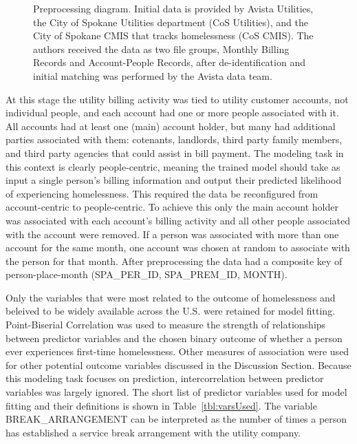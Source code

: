 \documentclass[10pt,letterpaper]{article}
\begin{document}
\begin{figure}[!h]
    \caption{Preprocessing diagram. Initial data is provided by Avista Utilities, the City of Spokane Utilities department (CoS Utilities), and the City of Spokane CMIS that tracks homelessness (CoS CMIS). The authors received the data as two file groups, Monthly Billing Records and Account-People Records, after de-identification and initial matching was performed by the Avista data team.}
    \label{fig:preprocessing}
\end{figure}

At this stage the utility billing activity was tied to utility customer accounts, not individual people, and each account had one or more people associated with it. All accounts had at least one (main) account holder, but many had additional parties associated with them: cotenants, landlords, third party family members, and third party agencies that could assist in bill payment. The modeling task in this context is clearly people-centric, meaning the trained model should take as input a single person's billing information and output their predicted likelihood of experiencing homelessness. This required the data be reconfigured from account-centric to people-centric. To achieve this only the main account holder was associated with each account's billing activity and all other people associated with the account were removed. If a person was associated with more than one account for the same month, one account was chosen at random to associate with the person for that month. After preprocessing the data had a composite key of person-place-month (SPA\_PER\_ID, SPA\_PREM\_ID, MONTH).

Only the variables that were most related to the outcome of homelessness and beleived to be widely available across the U.S. were retained for model fitting. Point-Biserial Correlation was used to measure the strength of relationships between predictor variables and the chosen binary outcome of whether a person ever experiences first-time homelessness. Other measures of association were used for other potential outcome variables discussed in the Discussion Section. Because this modeling task focuses on prediction, intercorrelation between predictor variables was largely ignored. The short list of predictor variables used for model fitting and their definitions is shown in Table~\ref{tbl:varsUsed}. The variable BREAK\_ARRANGEMENT can be interpreted as the number of times a person has established a service break arrangement with the utility company.
\end{document}
